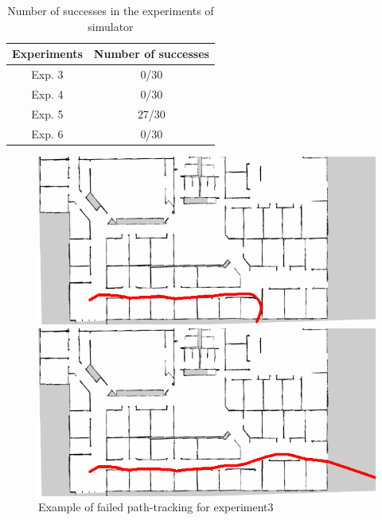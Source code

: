 \newpage
\begin{table}[h]
  \centering
  \caption{Number of successes in the experiments of simulator}
  \begin{tabular}{|c|c|} \hline
      Experiments & Number of successes \\ \hline
      Exp. 3 & 0/30 \\ \hline
      Exp. 4 & 0/30 \\ \hline
      Exp. 5 & 27/30 \\ \hline
      Exp. 6 & 0/30 \\ \hline
    \end{tabular}
  \label{tb:inves}
\end{table}

\begin{figure}[h]
  \begin{minipage}[b]{0.45\linewidth}
    \centering
    \includegraphics[keepaspectratio, scale=0.33]{images/exp3/traject30.png}
    \subcaption{}
  \end{minipage}
  \begin{minipage}[b]{0.45\linewidth}
    \centering
    \includegraphics[keepaspectratio, scale=0.33]{images/exp3/traject25.png}
    \subcaption{}
  \end{minipage}
\caption{Example of failed path-tracking for experiment3}
\label{Fig:fail3}
\end{figure}

